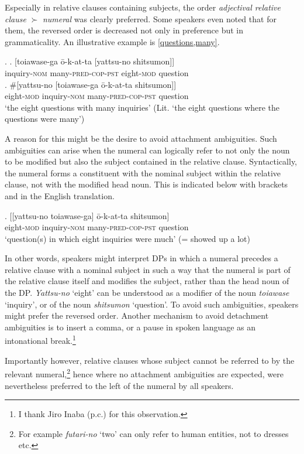 \documentclass [output=book,colorlinks,citecolor=brown]{langscibook}
\begin{document}
Especially in relative clauses containing subjects, the order \textit{adjectival relative clause} $\succ$ \textit{numeral} was clearly preferred. Some speakers even noted that for them, the reversed order is decreased not only in preference but in grammaticality. An illustrative example is \ref{questions,many}. %

\ex. \label{questions,many} \ag. [toiawase-ga ō-k-at-ta [yattsu-no shitsumon]]\\
inquiry-\textsc{nom} many-\textsc{pred-cop-pst} eight-\textsc{mod} question\\
\bg. \#[yattsu-no [toiawase-ga ō-k-at-ta shitsumon]]\\
eight-\textsc{mod} inquiry-\textsc{nom} many-\textsc{pred-cop-pst} question\\
`the eight questions with many inquiries’ (Lit. `the eight questions where the questions were many’)

A reason for this might be the desire to avoid attachment ambiguities. Such ambiguities can arise when the numeral can logically refer to not only the noun to be modified but also the subject contained in the relative clause. Syntactically, the numeral forms a constituent with the nominal subject within the relative clause, not with the modified head noun. This is indicated below with brackets and in the English translation. %

\newpage

\exg. [[yattsu-no toiawase-ga] ō-k-at-ta shitsumon]\\
eight-\textsc{mod} inquiry-\textsc{nom} many-\textsc{pred-cop-pst} question\\
`question(s) in which eight inquiries were much’ (= showed up a lot)

In other words, speakers might interpret DPs in which a numeral precedes a relative clause with a nominal subject in such a way that the numeral is part of the relative clause itself and modifies the subject, rather than the head noun of the DP. \textit{Yattsu-no} `eight’ can be understood as a modifier of the noun \textit{toiawase} `inquiry’, or of the noun \textit{shitsumon} `question’. To avoid such ambiguities, speakers might prefer the reversed order. Another mechanism to avoid detachment ambiguities is to insert a comma, or a pause in spoken language as an intonational break.\footnote{I thank Jiro Inaba (p.c.) for this observation.}

Importantly however, relative clauses whose subject cannot be referred to by the relevant numeral,\footnote{For example \textit{futari-no} `two’ can only refer to human entities, not to dresses etc.} hence where no attachment ambiguities are expected, were nevertheless preferred to the left of the numeral by all speakers.
\end{document}
